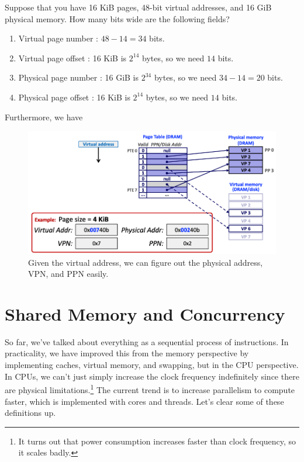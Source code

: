 \documentclass{article}
\begin{document}
    \begin{example}
      Suppose that you have 16 KiB pages, 48-bit virtual addresses, and 16 GiB physical memory. How many bits wide are the following fields? 
      \begin{enumerate}
        \item Virtual page number : $48 - 14 = 34$ bits.
        \item Virtual page offset : 16 KiB is $2^{14}$ bytes, so we need $14$ bits.
        \item Physical page number : 16 GiB is $2^{34}$ bytes, so we need $34 - 14 = 20$ bits.
        \item Physical page offset : 16 KiB is $2^{14}$ bytes, so we need $14$ bits.
      \end{enumerate}
      Furthermore, we have 
      \begin{figure}[H]
        \centering 
        \includegraphics[scale=0.4]{img/page_example.png}
        \caption{Given the virtual address, we can figure out the physical address, VPN, and PPN easily. } 
        \label{fig:page_example}
      \end{figure}
    \end{example}

\section{Shared Memory and Concurrency}

    So far, we've talked about everything as a sequential process of instructions. In practicality, we have improved this from the memory perspective by implementing caches, virtual memory, and swapping, but in the CPU perspective. In CPUs, we can't just simply increase the clock frequency indefinitely since there are physical limitations.\footnote{It turns out that power consumption increases faster than clock frequency, so it scales badly.} The current trend is to increase parallelism to compute faster, which is implemented with cores and threads. Let's clear some of these definitions up. 
\end{document}
